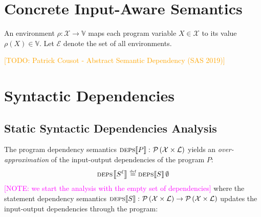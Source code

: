 \documentclass{article}
\newcommand{\defined}{\ensuremath{\stackrel{\mbox{\tiny def}}{=}}\xspace} %
\newcommand{\vars}{\ensuremath{\mathcal{X}}\xspace} %
\newcommand{\vals}{\ensuremath{\mathbb{V}}\xspace} %
\newcommand{\powerset}[1]{\ensuremath{\mathcal{P}\left(#1\right)}\xspace} %
\newcommand{\labels}{\ensuremath{\mathcal{L}}\xspace} %
\newcommand{\envs}{\ensuremath{\mathcal{E}}\xspace} %
\newcommand{\semantics}[1]{\ensuremath{\left\llbracket #1 \right\rrbracket}\xspace} %
\newcommand{\deps}[1]{\ensuremath{\textsc{deps}\!\semantics{#1}}\xspace} %
\newcommand{\irem}[3]{{\noindent\textcolor{#1}{\textsf{[#2: 
#3]}}}}
\newcommand{\todo}[1]{\irem{orange}{TODO}{#1}}
\newcommand{\note}[1]{\irem{magenta}{NOTE}{#1}}
\begin{document}
\section*{Concrete Input-Aware Semantics}

An environment $\rho\colon \vars \rightarrow \vals$ maps each program variable $X \in \vars$ to its value $\rho(X) \in \vals$. Let \envs denote the set of all environments. 

\todo{Patrick Cousot - Abstract Semantic Dependency (SAS 2019)}


\section*{Syntactic Dependencies}

\subsection*{Static Syntactic Dependencies Analysis}

The program dependency semantics $\deps{P} \colon \powerset{\vars \times \labels}$ yields an \emph{over-approximation} of the input-output dependencies of the program $P$:
\begin{equation*}
\deps{S^\ell{}} \defined \deps{S}\emptyset
\end{equation*}
\note{we start the analysis with the empty set of dependencies}
where the statement dependency semantics $\deps{S} \colon \powerset{\vars \times \labels} \rightarrow  \powerset{\vars \times \labels}$ updates the input-output dependencies through the program:
\end{document}
